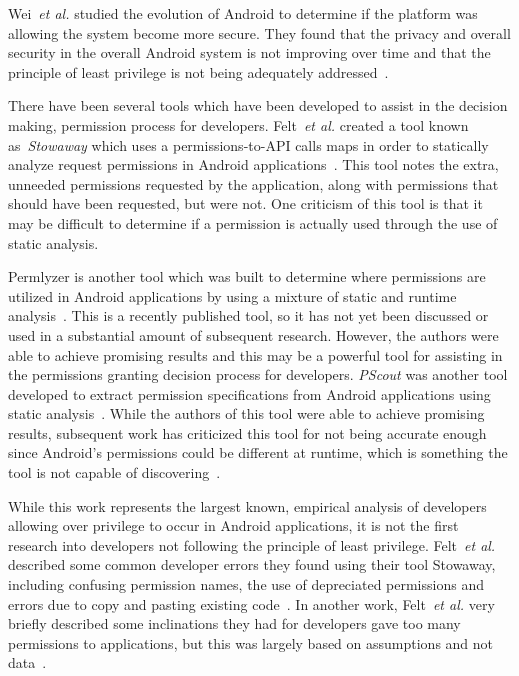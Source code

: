 \documentclass{sig-alternate}
\begin{document}
Wei~\emph{et al.} studied the evolution of Android to determine if the platform was allowing the system become more secure. They found that the privacy and overall security in the overall Android system is not improving over time and that the principle of least privilege is not being adequately addressed~\cite{Wei:2012:PEA:2420950.2420956}. %


There have been several tools which have been developed to assist in the decision making, permission process for developers. Felt~\emph{et al.} created a tool known as~\emph{Stowaway} which uses a permissions-to-API calls maps in order to statically analyze request permissions in Android applications~\cite{Felt:2011:APD:2046707.2046779}. This tool notes the extra, unneeded permissions requested by the application, along with permissions that should have been requested, but were not. One criticism of this tool is that it may be difficult to determine if a permission is actually used through the use of static analysis.

Permlyzer is another tool which was built to determine where permissions are utilized in Android applications by using a mixture of static and runtime analysis~\cite{6698893}. This is a recently published tool, so it has not yet been discussed or used in a substantial amount of subsequent research. However, the authors were able to achieve promising results and this may be a powerful tool for assisting in the permissions granting decision process for developers. \emph{PScout} was another tool developed to extract permission specifications from Android applications using static analysis~\cite{Au:2012:PAA:2382196.2382222}. While the authors of this tool were able to achieve promising results, subsequent work has criticized this tool for not being accurate enough since Android's permissions could be different at runtime, which is something the tool is not capable of discovering~\cite{zhang2013vetting}.

While this work represents the largest known, empirical analysis of developers allowing over privilege to occur in Android applications, it is not the first research into developers not following the principle of least privilege. Felt~\emph{et al.} described some common developer errors they found using their tool Stowaway, including confusing permission names, the use of depreciated permissions and errors due to copy and pasting existing code~\cite{Felt:2011:APD:2046707.2046779}. In another work,  Felt~\emph{et al.} very briefly described some inclinations they had for developers gave too many permissions to applications, but this was largely based on assumptions and not data~\cite{Felt:2011:EAP:2002168.2002175}.
\end{document}
